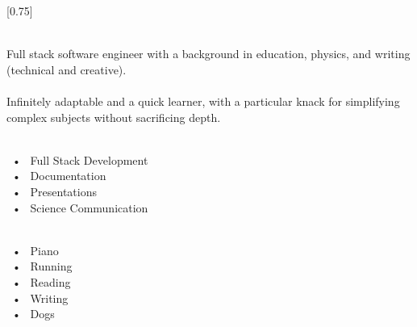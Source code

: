 \documentclass[lighthipster]{simplehipstercv}
\begin{document}
\setlength{\columnsep}{1.5cm}
[0.75]
\begin{paracol}{2}

\paracolbackgroundoptions



\footnotesize
{\setasidefontcolour
\begin{center}
\end{center}

\\[0.5em]

Full stack software engineer with a background in education, physics, and writing (technical and creative).\\\\Infinitely adaptable and a quick learner, with a particular knack for simplifying complex subjects without sacrificing depth.

\bigskip

 \\[0.5em]
~•~ Full Stack Development\\~•~ Documentation\\~•~ Presentations\\~•~ Science Communication

\bigskip

\\[0.5em]
~•~ Piano\\~•~ Running\\~•~ Reading \\~•~ Writing\\~•~ Dogs

\vspace{4em}

\\


\phantom{turn the page}

\phantom{turn the page}
}
\switchcolumn


\end{paracol}
\end{document}
